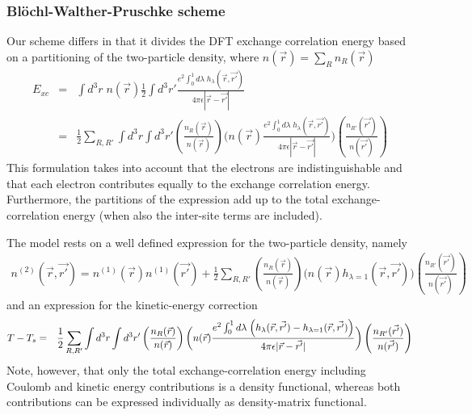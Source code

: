 \documentclass[11pt,a4paper]{report}
\begin{document}
\subsubsection{Bl\"ochl-Walther-Pruschke scheme}
Our scheme\cite{bloechl11_prb84_205101} differs in that it divides the
DFT exchange correlation energy based on a partitioning of the
two-particle density, where $n(\vec{r})=\sum_R n_R(\vec{r})$
\begin{eqnarray}
E_{xc}
&=&\int d^3r\;n(\vec{r})
\frac{1}{2}\int d^3r'\frac{e^2 \int_0^1d\lambda\;h_\lambda (\vec{r},\vec{r'})}
{4\pi\epsilon|\vec{r}-\vec{r'}|}
\nonumber\\
&=&\frac{1}{2}\sum_{R,R'}\int d^3r\int d^3r'
\left(\frac{n_R(\vec{r})}{n(\vec{r})}\right)
\biggl(
n(\vec{r})
\frac{e^2 \int_0^1d\lambda\;h_\lambda (\vec{r},\vec{r'})}
{4\pi\epsilon|\vec{r}-\vec{r'}|}\biggr)
\left(\frac{n_{R'}(\vec{r'})}{n(\vec{r'})}\right)
\end{eqnarray}
This formulation takes into account that the electrons are
indistinguishable and that each electron contributes equally to the
exchange correlation energy. Furthermore, the partitions of the
expression add up to the total exchange-correlation energy (when also
the inter-site terms are included).

The model rests on a well defined expression for the two-particle
density, namely
\begin{eqnarray}
n^{(2)}(\vec{r},\vec{r'})=n^{(1)}(\vec{r})n^{(1)}(\vec{r'})
+
\frac{1}{2}\sum_{R,R'}
\left(\frac{n_R(\vec{r})}{n(\vec{r})}\right)
\biggl(
n(\vec{r})h_{\lambda=1} (\vec{r},\vec{r'})
\biggr)
\left(\frac{n_{R'}(\vec{r'})}{n(\vec{r'})}\right)
\end{eqnarray}
and an expression for the kinetic-energy correction 
\begin{eqnarray}
T-T_s
&=&\frac{1}{2}\sum_{R,R'}\int d^3r\int d^3r'
\left(\frac{n_R(\vec{r})}{n(\vec{r})}\right)
\biggl(
n(\vec{r})
\frac{e^2 \int_0^1d\lambda\;\Bigl(h_\lambda (\vec{r},\vec{r'})
-h_{\lambda=1} (\vec{r},\vec{r'})\Bigr)}
{4\pi\epsilon|\vec{r}-\vec{r'}|}\biggr)
\left(\frac{n_{R'}(\vec{r'})}{n(\vec{r'})}\right)
\nonumber\\
\end{eqnarray}
Note, however, that only the total exchange-correlation energy
including Coulomb and kinetic energy contributions is a density
functional, whereas both contributions can be expressed individually
as density-matrix functional.
\end{document}
